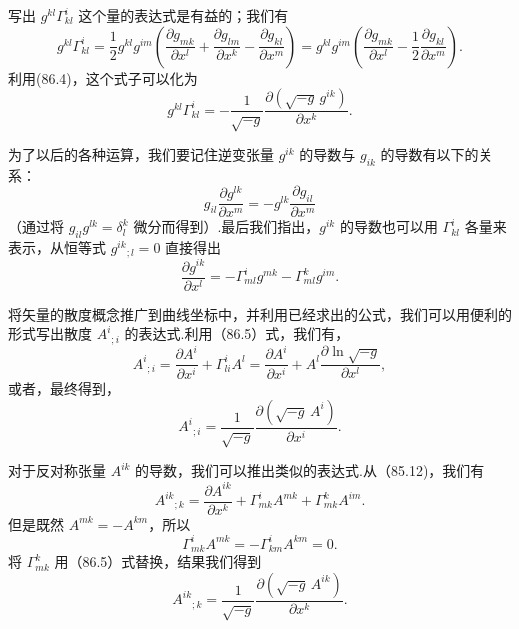 写出 $g^{kl}\Gamma^i_{kl}$ 这个量的表达式是有益的；我们有
\begin{equation*}
  g^{kl}\Gamma^i_{kl}=\frac{1}{2}g^{kl}g^{im}\left(
  \frac{\partial g_{mk}}{\partial x^l}
  +\frac{\partial g_{lm}}{\partial x^k}
  -\frac{\partial g_{kl}}{\partial x^m}\right)
  =g^{kl}g^{im}\left(\frac{\partial g_{mk}}{\partial x^l}
  -\frac{1}{2}\frac{\partial g_{kl}}{\partial x^m}\right).
\end{equation*}
利用(86.4)，这个式子可以化为
\begin{equation}
  g^{kl}\Gamma^i_{kl}=-\frac{1}{\sqrt{-g}}
  \frac{\partial(\sqrt{-g}\,g^{ik})}{\partial x^k}.
\end{equation}

为了以后的各种运算，我们要记住逆变张量 $g^{ik}$ 的导数与 $g_{ik}$ 的导数有以下的关系：
\begin{equation}
  g_{il}\frac{\partial g^{lk}}{\partial x^m}
  =-g^{lk}\frac{\partial g_{il}}{\partial x^m}
\end{equation}
（通过将 $g_{il}g^{lk}=\delta^k_l$ 微分而得到）.最后我们指出，$g^{ik}$ 的导数也可以用 $\Gamma^i_{kl}$ 各量来表示，从恒等式 $g^{ik}{}_{;l}=0$ 直接得出
\begin{equation}
  \frac{\partial g^{ik}}{\partial x^l}
  =-\Gamma^i_{ml}g^{mk}-\Gamma^k_{ml}g^{im}.
\end{equation}

将矢量的散度概念推广到曲线坐标中，并利用已经求出的公式，我们可以用便利的形式写出散度 $A^i{}_{;i}$ 的表达式.利用（86.5）式，我们有，
\begin{equation*}
  A^i{}_{;i}=\frac{\partial A^i}{\partial x^i}
  +\Gamma^i_{li}A^l
  =\frac{\partial A^i}{\partial x^i}
  +A^l\frac{\partial\ln\sqrt{-g}}{\partial x^l},
\end{equation*}
或者，最终得到，
\begin{equation}
  A^i{}_{;i}=\frac{1}{\sqrt{-g}}
  \frac{\partial(\sqrt{-g}\,A^i)}{\partial x^i}.
\end{equation}

对于反对称张量 $A^{ik}$ 的导数，我们可以推出类似的表达式.从（85.12)，我们有
\begin{equation*}
  A^{ik}{}_{;k}=\frac{\partial A^{ik}}{\partial x^k}
  +\Gamma^i_{mk}A^{mk}+\Gamma^k_{mk}A^{im}.
\end{equation*}
但是既然 $A^{mk}=-A^{km}$，所以
\begin{equation*}
  \Gamma^i_{mk}A^{mk}=-\Gamma^i_{km}A^{km}=0.
\end{equation*}
将 $\Gamma^k_{mk}$ 用（86.5）式替换，结果我们得到
\begin{equation}
  A^{ik}{}_{;k}=\frac{1}{\sqrt{-g}}
  \frac{\partial(\sqrt{-g}\,A^{ik})}{\partial x^k}.
\end{equation}

